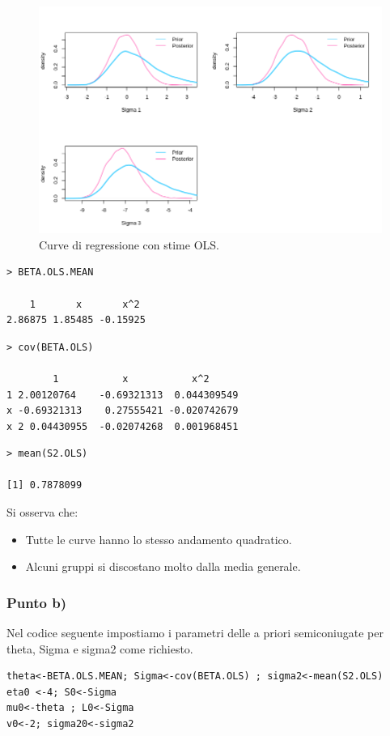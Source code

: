 \begin{figure}
    \centering
    \includegraphics[totalheight=8cm]{img/esercizio11-2-1.png}
    \caption{ Curve di regressione con stime OLS.}
\end{figure}

{
\color{red}
\begin{Verbatim}
> BETA.OLS.MEAN

    1       x       x^2
2.86875 1.85485 -0.15925
\end{Verbatim}
}
\newpage
{
\color{red}
\begin{Verbatim}
> cov(BETA.OLS)

        1           x           x^2
1 2.00120764    -0.69321313  0.044309549
x -0.69321313    0.27555421 -0.020742679
x 2 0.04430955  -0.02074268  0.001968451
\end{Verbatim}
}

{
\color{red}
\begin{Verbatim}
> mean(S2.OLS)

[1] 0.7878099
\end{Verbatim}
}

Si osserva che:
\begin{itemize}[-]
    \item Tutte le curve hanno lo stesso andamento quadratico.
    \item Alcuni gruppi si discostano molto dalla media generale.
\end{itemize}

\subsubsection*{Punto b)}
Nel codice seguente impostiamo i parametri delle a priori semiconiugate per theta, Sigma e sigma2 come richiesto.
\begin{lstlisting}[style=R]
theta<-BETA.OLS.MEAN; Sigma<-cov(BETA.OLS) ; sigma2<-mean(S2.OLS)
eta0 <-4; S0<-Sigma
mu0<-theta ; L0<-Sigma
v0<-2; sigma20<-sigma2
\end{lstlisting}

